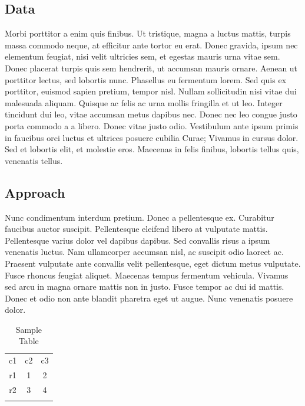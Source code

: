 \documentclass[10pt,conference]{ieeeconf}
\begin{document}
\subsection{Data}

Morbi porttitor a enim quis finibus. Ut tristique, magna a luctus mattis, turpis massa commodo neque, at efficitur ante tortor eu erat. Donec gravida, ipsum nec elementum feugiat, nisi velit ultricies sem, et egestas mauris urna vitae sem. Donec placerat turpis quis sem hendrerit, ut accumsan mauris ornare. Aenean ut porttitor lectus, sed lobortis nunc. Phasellus eu fermentum lorem. Sed quis ex porttitor, euismod sapien pretium, tempor nisl. Nullam sollicitudin nisi vitae dui malesuada aliquam. Quisque ac felis ac urna mollis fringilla et ut leo. Integer tincidunt dui leo, vitae accumsan metus dapibus nec. Donec nec leo congue justo porta commodo a a libero. Donec vitae justo odio. Vestibulum ante ipsum primis in faucibus orci luctus et ultrices posuere cubilia Curae; Vivamus in cursus dolor. Sed et lobortis elit, et molestie eros. Maecenas in felis finibus, lobortis tellus quis, venenatis tellus.

\subsection{Approach}

Nunc condimentum interdum pretium. Donec a pellentesque ex. Curabitur faucibus auctor suscipit. Pellentesque eleifend libero at vulputate mattis. Pellentesque varius dolor vel dapibus dapibus. Sed convallis risus a ipsum venenatis luctus. Nam ullamcorper accumsan nisl, ac suscipit odio laoreet ac. Praesent vulputate ante convallis velit pellentesque, eget dictum metus vulputate. Fusce rhoncus feugiat aliquet. Maecenas tempus fermentum vehicula. Vivamus sed arcu in magna ornare mattis non in justo. Fusce tempor ac dui id mattis. Donec et odio non ante blandit pharetra eget ut augue. Nunc venenatis posuere dolor.


\begin{table}[H]
\centering
\caption{Sample Table}
\label{tab:1}       %
\begin{tabular}{ccc}
\hline\noalign{\smallskip}
c1 & c2 & c3\\
\noalign{\smallskip}\hline\noalign{\smallskip}
r1 & 1 & 2 \\
r2 & 3 & 4 \\
\noalign{\smallskip}\hline\noalign{\smallskip}
\end{tabular}
\end{table}
\end{document}
